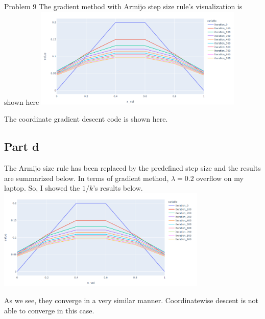 \documentclass[10pt]{article}
\begin{document}
\begin{section}{Problem 9}
The gradient method with Armijo step size rule's visualization is shown here
\includegraphics[width=10cm]{img/problem9_plt2.png}

The coordinate gradient descent code is shown here. 

\subsection{Part d}
The Armijo size rule has been replaced by the predefined step size and the results are summarized below. In terms of gradient method, $\lambda = 0.2$ overflow on my laptop. So, I showed the $1/k$'s results below. \\
\includegraphics[width=10cm]{img/problem9_plt3.png}

As we see, they converge in a very similar manner. Coordinatewise descent is not able to converge in this case. 
\end{section}
\end{document}
